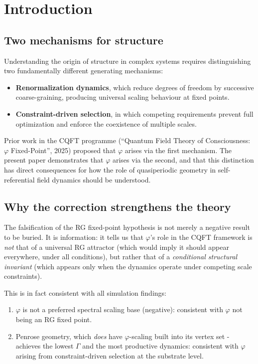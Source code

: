 \documentclass[11pt,a4paper]{article}
\theoremstyle{plain}
\theoremstyle{definition}
\newcommand{\phiGolden}{\varphi}
\begin{document}
\section{Introduction}
\label{sec:intro}

\subsection{Two mechanisms for structure}

Understanding the origin of structure in complex systems requires
distinguishing two fundamentally different generating mechanisms:

\begin{itemize}[noitemsep]
  \item \textbf{Renormalization dynamics}, which reduce degrees of freedom
    by successive coarse-graining, producing universal scaling behaviour
    at fixed points.
  \item \textbf{Constraint-driven selection}, in which competing requirements
    prevent full optimization and enforce the coexistence of multiple scales.
\end{itemize}

Prior work in the CQFT programme
(``Quantum Field Theory of Consciousness: $\phiGolden$ Fixed-Point'', 2025)
proposed that $\phiGolden$ arises via the first mechanism. The present
paper demonstrates that $\phiGolden$ arises via the second, and that this
distinction has direct consequences for how the role of quasiperiodic
geometry in self-referential field dynamics should be understood.

\subsection{Why the correction strengthens the theory}

The falsification of the RG fixed-point hypothesis is not merely a negative
result to be buried. It is information: it tells us that $\phiGolden$'s
role in the CQFT framework is \emph{not} that of a universal RG attractor
(which would imply it should appear everywhere, under all conditions),
but rather that of a \emph{conditional structural invariant} (which appears
only when the dynamics operate under competing scale constraints).

This is in fact consistent with all simulation findings:
\begin{enumerate}[noitemsep]
  \item $\phiGolden$ is not a preferred spectral scaling base (negative):
    consistent with $\phiGolden$ not being an RG fixed point.
  \item Penrose geometry, which \emph{does} have $\phiGolden$-scaling
    built into its vertex set - achieves the lowest $\Gamma$ and the
    most productive dynamics: consistent with $\phiGolden$ arising
    from constraint-driven selection at the substrate level.
\end{enumerate}
\end{document}
